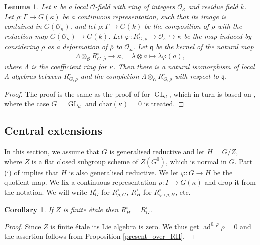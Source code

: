 \documentclass{amsart}
\newtheorem{lem}[prop]{Lemma}
\newtheorem{cor}[prop]{Corollary}
\theoremstyle{definition}
\theoremstyle{remark}
\DeclareMathOperator{\GL}{GL}
\newcommand{\OO}{\mathcal O}
\DeclareMathOperator{\ad}{ad}
\newcommand{\qq}{\mathfrak{q}}
\newcommand{\rhobar}{\overline{\rho}}
\newcommand{\chara}{\mathrm{char}}
\begin{document}
\begin{lem}\label{extend_scalars2} Let $\kappa$ be a local $\OO$-field with ring of integers $\OO_{\kappa}$ and 
residue field $k$.  Let $\rho: \Gamma \rightarrow G(\kappa)$ be a continuous representation, 
such that its image is contained in $G(\OO_{\kappa})$, and let $\rhobar:\Gamma \rightarrow 
G(k)$ be the composition of $\rho$ with the reduction map $G(\OO_{\kappa})\rightarrow G(k)$. 
Let $\varphi: R^{\square}_{G, \rhobar} \rightarrow \OO_{\kappa}\hookrightarrow \kappa$ be 
the map induced by considering $\rho$ as a deformation of $\rhobar$ to $\OO_{\kappa}$. Let $\qq$ be the kernel of the natural map 
$$\Lambda\otimes_{\OO} R^{\square}_{G, \rhobar} \rightarrow \kappa, \quad \lambda\otimes a\mapsto \bar{\lambda} \varphi(a),$$
where $\Lambda$ is the coefficient ring for $\kappa$. Then there is a natural isomorphism of local 
$\Lambda$-algebras between $R^{\square}_{G, \rho}$ and the completion  
$\Lambda\otimes_{\OO} R^{\square}_{G, \rhobar}$ with respect to $\qq$. 
\end{lem}
\begin{proof} The proof is the same as the proof of \cite[Theorem 3.3.1]{BJ_new} for $\GL_d$, which 
in turn is based on \cite[Proposition 9.5]{kisin_over}, where the case $G=\GL_d$ and $\chara(\kappa)=0$ is treated.  
\end{proof}






\subsection{Central extensions}\label{sec_centr_ext} In this section, we assume that $G$ is generalised reductive and  let $H=G/Z$, where 
$Z$ is a flat closed subgroup scheme of $Z(G^0)$, which is normal in $G$. 
Part (i) of \cite[Exercise 5.5.9]{bcnrd} implies that $H$ is also generalised reductive. We let 
$\varphi: G \rightarrow H$ be the quotient map. 
 We fix a continuous 
representation $\rho: \Gamma\rightarrow G(\kappa)$ and drop it from the notation.  We will write $R^{\square}_{G}$ for $R^{\square}_{\rho, G}$, $R^{\square}_H$ for 
$R^{\square}_{\varphi\circ \rho, H}$, etc. 

\begin{cor}\label{fin_et} If $Z$ is finite \'etale
 then $R^{\square}_{ H}=R^{\square}_{ G}$. 
\end{cor} 
\begin{proof} Since $Z$ is finite \'etale its Lie algebra is zero. We thus get $\ad^{0,\varphi}\rho=0$ 
and the assertion follows from Proposition \ref{present_over_RH}.
\end{proof}
\end{document}
